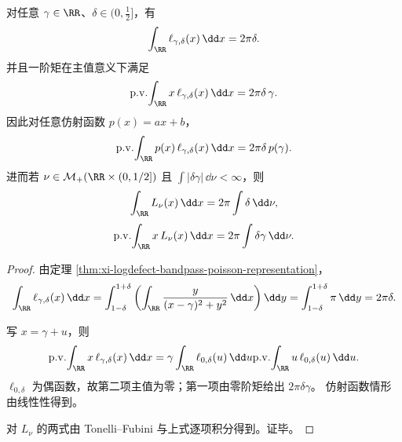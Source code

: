 \begin{theorem}[对数缺陷核的零阶矩与一阶仿射再现恒等式]\label{thm:xi-logdefect-affine-reproducing-moment-identities}
对任意 \(\gamma\in\RR\)、\(\delta\in(0,\tfrac12]\)，有
\[
\int_{\RR}\ell_{\gamma,\delta}(x)\,\dd x=2\pi\delta.
\]
并且一阶矩在主值意义下满足
\[
\mathrm{p.v.}\!\int_{\RR}x\,\ell_{\gamma,\delta}(x)\,\dd x
=
2\pi\delta\,\gamma.
\]
因此对任意仿射函数 \(p(x)=ax+b\)，
\[
\mathrm{p.v.}\!\int_{\RR}p(x)\,\ell_{\gamma,\delta}(x)\,\dd x
=
2\pi\delta\,p(\gamma).
\]
进而若 \(\nu\in\mathcal{M}_+(\RR\times(0,1/2])\) 且
\(\int |\delta\gamma|\,\dd\nu<\infty\)，则
\[
\int_{\RR}L_\nu(x)\,\dd x
=
2\pi\int \delta\,\dd\nu,
\]
\[
\mathrm{p.v.}\!\int_{\RR}x\,L_\nu(x)\,\dd x
=
2\pi\int \delta\gamma\,\dd\nu.
\]
\end{theorem}
\begin{proof}
由定理 \ref{thm:xi-logdefect-bandpass-poisson-representation}，
\[
\int_{\RR}\ell_{\gamma,\delta}(x)\,\dd x
=
\int_{1-\delta}^{1+\delta}\left(\int_{\RR}\frac{y}{(x-\gamma)^2+y^2}\,\dd x\right)\dd y
=
\int_{1-\delta}^{1+\delta}\pi\,\dd y
=
2\pi\delta.
\]

写 \(x=\gamma+u\)，则
\[
\mathrm{p.v.}\!\int_{\RR}x\,\ell_{\gamma,\delta}(x)\,\dd x
=
\gamma\int_{\RR}\ell_{0,\delta}(u)\,\dd u
\mathrm{p.v.}\!\int_{\RR}u\,\ell_{0,\delta}(u)\,\dd u.
\]
\(\ell_{0,\delta}\) 为偶函数，故第二项主值为零；第一项由零阶矩给出 \(2\pi\delta\gamma\)。
仿射函数情形由线性性得到。

对 \(L_\nu\) 的两式由 Tonelli--Fubini 与上式逐项积分得到。证毕。
\end{proof}

